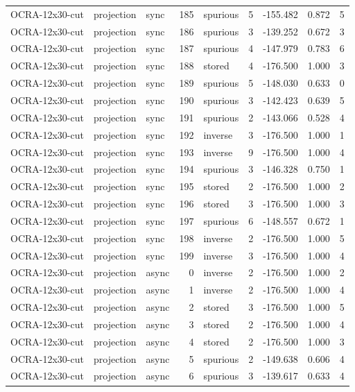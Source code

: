 \begin{tabular}{lllrlrrrr}
OCRA-12x30-cut & projection & sync & 185 & spurious & 5 & -155.482 & 0.872 & 5 \\
OCRA-12x30-cut & projection & sync & 186 & spurious & 3 & -139.252 & 0.672 & 3 \\
OCRA-12x30-cut & projection & sync & 187 & spurious & 4 & -147.979 & 0.783 & 6 \\
OCRA-12x30-cut & projection & sync & 188 & stored & 4 & -176.500 & 1.000 & 3 \\
OCRA-12x30-cut & projection & sync & 189 & spurious & 5 & -148.030 & 0.633 & 0 \\
OCRA-12x30-cut & projection & sync & 190 & spurious & 3 & -142.423 & 0.639 & 5 \\
OCRA-12x30-cut & projection & sync & 191 & spurious & 2 & -143.066 & 0.528 & 4 \\
OCRA-12x30-cut & projection & sync & 192 & inverse & 3 & -176.500 & 1.000 & 1 \\
OCRA-12x30-cut & projection & sync & 193 & inverse & 9 & -176.500 & 1.000 & 4 \\
OCRA-12x30-cut & projection & sync & 194 & spurious & 3 & -146.328 & 0.750 & 1 \\
OCRA-12x30-cut & projection & sync & 195 & stored & 2 & -176.500 & 1.000 & 2 \\
OCRA-12x30-cut & projection & sync & 196 & stored & 3 & -176.500 & 1.000 & 3 \\
OCRA-12x30-cut & projection & sync & 197 & spurious & 6 & -148.557 & 0.672 & 1 \\
OCRA-12x30-cut & projection & sync & 198 & inverse & 2 & -176.500 & 1.000 & 5 \\
OCRA-12x30-cut & projection & sync & 199 & inverse & 3 & -176.500 & 1.000 & 4 \\
OCRA-12x30-cut & projection & async & 0 & inverse & 2 & -176.500 & 1.000 & 2 \\
OCRA-12x30-cut & projection & async & 1 & inverse & 2 & -176.500 & 1.000 & 4 \\
OCRA-12x30-cut & projection & async & 2 & stored & 3 & -176.500 & 1.000 & 5 \\
OCRA-12x30-cut & projection & async & 3 & stored & 2 & -176.500 & 1.000 & 4 \\
OCRA-12x30-cut & projection & async & 4 & stored & 2 & -176.500 & 1.000 & 3 \\
OCRA-12x30-cut & projection & async & 5 & spurious & 2 & -149.638 & 0.606 & 4 \\
OCRA-12x30-cut & projection & async & 6 & spurious & 3 & -139.617 & 0.633 & 4 \\

\end{tabular}
